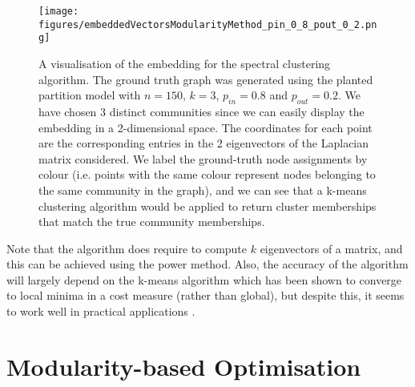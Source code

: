 \begin{figure}
	\centering
	\texttt{[image: figures/embeddedVectorsModularityMethod\_pin\_0\_8\_pout\_0\_2.png]}
	\caption[Visualisation of spectral clustering embedding]{\label{fig:SpectralClusteringEmbeddingVisualisation} A visualisation of the embedding for the spectral clustering algorithm. The ground truth graph was generated using the planted partition model with $n=150$, $k=3$, $p_{in}=0.8$ and $p_{out}=0.2$. We have chosen $3$ distinct communities since we can easily display the embedding in a 2-dimensional space. The coordinates for each point are the corresponding entries in the 2 eigenvectors of the Laplacian matrix considered. We label the ground-truth node assignments by colour (i.e. points with the same colour represent nodes belonging to the same community in the graph), and we can see that a k-means clustering algorithm would be applied to return cluster memberships that match the true community memberships.}
\end{figure}

Note that the algorithm does require to compute $k$ eigenvectors of a matrix, and this can be achieved using the power method.
Also, the accuracy of the algorithm will largely depend on the k-means algorithm which has been shown to converge to local minima in a cost measure (rather than global), but despite this, it seems to work well in practical applications \cite{Lux06,For10}.


\section{Modularity-based Optimisation}
\label{sec:modularityBasedOptimisation}
 
